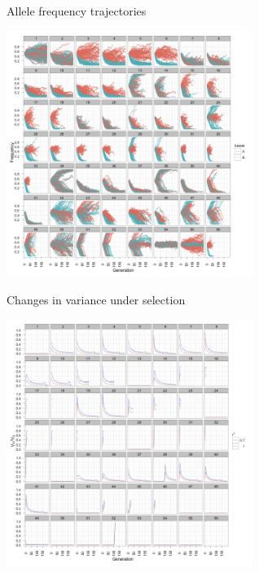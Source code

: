 \documentclass{beamer}
\begin{document}
\begin{frame}{Allele frequency trajectories}
\begin{center}
\includegraphics[width=8cm]{sup_allelefreq_sim.png}
\end{center}
\end{frame}

\begin{frame}{Changes in variance under selection}
\begin{center}
\includegraphics[width=8cm]{sup_propadditive_det.png}
\end{center}
\end{frame}
\end{document}
